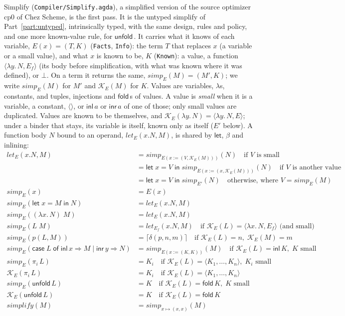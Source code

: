 \documentclass[10pt]{article}
\theoremstyle{acmplain}
\newcommand{\key}[1]{\mathsf{#1}}
\newcommand{\pass}[1]{\mathit{#1}}
\newcommand{\lam}[1]{\lambda #1.\,}
\newcommand{\Let}{\key{let}\;}
\newcommand{\In}{\;\key{in}\;}
\newcommand{\inl}{\key{inl}\,}
\newcommand{\inr}{\key{inr}\,}
\newcommand{\Case}[5]{\key{case}\;#1\;\key{of}\;\key{inl}\,#2 \Rightarrow #3 \mid \key{inr}\,#4 \Rightarrow #5}
\newcommand{\tuple}[1]{\langle #1 \rangle}
\newcommand{\prj}[1]{\pi_{#1}\,}
\newcommand{\emptytup}{\langle\rangle}
\newcommand{\prim}[3]{#1(#2, #3)}
\newcommand{\res}[1]{\lceil #1 \rceil}
\newcommand{\ext}[3]{#1(#2{:=}#3)}
\newcommand{\Mfold}{\key{fold}\,}
\newcommand{\Munfold}{\key{unfold}\,}
\begin{document}
Simplify (\texttt{Compiler/Simplify.agda}), a simplified version of the
source optimizer cp0 of Chez Scheme, is the first pass. It is the
untyped simplify of Part~\ref{part:untyped}, intrinsically typed, with the
same design, rules and policy, and one more known-value rule, for
$\Munfold$. It carries what it knows of each variable, $E(x) = (T, K)$
(\texttt{Facts}, \texttt{Info}): the term $T$ that replaces $x$ (a variable
or a small value), and what $x$ is known to be, $K$ (\texttt{Known}): a
value, a function $\langle \lam{y} N, E_f \rangle$ (its body before
simplification, with what was known where it was defined), or $\bot$. On a
term it returns the same, $\pass{simp}_E(M) = (M', K)$; we write
$\pass{simp}_E(M)$ for $M'$ and $\mathcal{K}_E(M)$ for $K$. Values are
variables, $\lambda$s, constants, and tuples, injections and $\Mfold$s of
values. A value is \emph{small} when it is a variable, a constant,
$\emptytup$, or $\inl a$ or $\inr a$ of one of those; only small values
are duplicated. Values are known to be themselves, and
$\mathcal{K}_E(\lam{y} N) = \langle \lam{y} N, E \rangle$; under a binder
that stays, its variable is itself, known only as itself ($E'$ below). A
function body $N$ bound to an operand, $\pass{let}_E(x.N, M)$, is shared by
$\key{let}$, $\beta$ and inlining:
\begin{align*}
  \pass{let}_E(x.N, M) &= \pass{simp}_{\ext{E}{x}{(V, \mathcal{K}_E(M))}}(N)
    \quad \text{if } V \text{ is small} \\
  &= \Let x = V \In \pass{simp}_{\ext{E}{x}{(x, \mathcal{K}_E(M))}}(N)
    \quad \text{if } V \text{ is another value} \\
  &= \Let x = V \In \pass{simp}_{E'}(N)
    \quad \text{otherwise, where } V = \pass{simp}_E(M) \\[1ex]
  \pass{simp}_E(x) &= E(x) \\
  \pass{simp}_E(\Let x = M \In N) &= \pass{let}_E(x.N, M) \\
  \pass{simp}_E((\lam{x} N)\;M) &= \pass{let}_E(x.N, M) \\
  \pass{simp}_E(L\;M) &= \pass{let}_{E_f}(x.N, M)
    \quad \text{if } \mathcal{K}_E(L) = \langle \lam{x} N, E_f \rangle \text{ (and small)} \\
  \pass{simp}_E(\prim{p}{L}{M}) &= \res{\delta(p, n, m)}
    \quad \text{if } \mathcal{K}_E(L) = n,\; \mathcal{K}_E(M) = m \\
  \pass{simp}_E(\Case{L}{x}{M}{y}{N}) &= \pass{simp}_{\ext{E}{x}{(K, K)}}(M)
    \quad \text{if } \mathcal{K}_E(L) = \inl K,\; K \text{ small} \\
  \pass{simp}_E(\prj{i} L) &= K_i
    \quad \text{if } \mathcal{K}_E(L) = \tuple{K_1, \ldots, K_n},\; K_i \text{ small} \\
  \mathcal{K}_E(\prj{i} L) &= K_i
    \quad \text{if } \mathcal{K}_E(L) = \tuple{K_1, \ldots, K_n} \\
  \pass{simp}_E(\Munfold L) &= K
    \quad \text{if } \mathcal{K}_E(L) = \Mfold K,\; K \text{ small} \\
  \mathcal{K}_E(\Munfold L) &= K
    \quad \text{if } \mathcal{K}_E(L) = \Mfold K \\[1ex]
  \pass{simplify}(M) &= \pass{simp}_{x \mapsto (x, x)}(M)
\end{align*}
\end{document}
